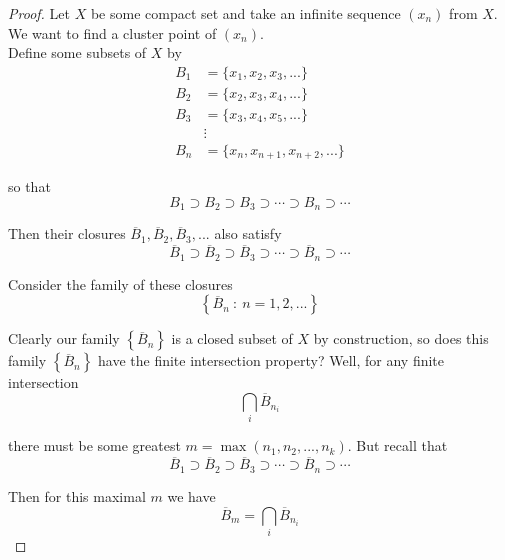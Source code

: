 \documentclass[12pt]{article}
\newlength\tindent
\renewcommand{\indent}{\hspace*{\tindent}}
\begin{document}
\begin{proof} Let $X$ be some compact set and take an infinite sequence $(x_n)$ from $X$. We want to find a cluster point of $(x_n)$. \\

Define some subsets of $X$ by
\begin{align*}
	B_1 &= \{x_1, x_2, x_3, ...\} \\
	B_2 &= \{x_2, x_3, x_4, ...\} \\
	B_3 &= \{x_3, x_4, x_5, ...\} \\
	&\vdots \\
	B_n &= \{x_n, x_{n + 1}, x_{n + 2}, ...\} 
\end{align*}

so that 
\begin{equation*}
	B_1 \supset B_2 \supset B_3 \supset \cdots \supset B_n \supset \cdots
\end{equation*}

Then their closures $\overline{B}_1, \overline{B}_2, \overline{B}_3, ...$ also satisfy
\begin{equation*}
	\overline{B}_1 \supset \overline{B}_2 \supset \overline{B}_3 \supset \cdots \supset \overline{B}_n \supset \cdots
\end{equation*}

Consider the family of these closures 
\begin{equation*}
	\left\{ \overline{B}_n ~:~ n = 1, 2, ... \right\}
\end{equation*}

\indent Clearly our family $\left\{ \overline{B}_n \right\}$ is a closed subset of $X$ by construction, so does this family $\left\{ \overline{B}_n \right\}$ have the finite intersection property? Well, for any finite intersection
\begin{equation*}
	\bigcap_{i} \overline{B}_{n_i}
\end{equation*}

there must be some greatest $m = \max \left( n_1, n_2, ..., n_k \right)$. But recall that
\begin{equation*}
	\overline{B}_1 \supset \overline{B}_2 \supset \overline{B}_3 \supset \cdots \supset \overline{B}_n \supset \cdots
\end{equation*}

Then for this maximal $m$ we have
\begin{equation*}
	\overline{B}_m = \bigcap_{i} \overline{B}_{n_i}
\end{equation*}


\end{proof}
\end{document}
